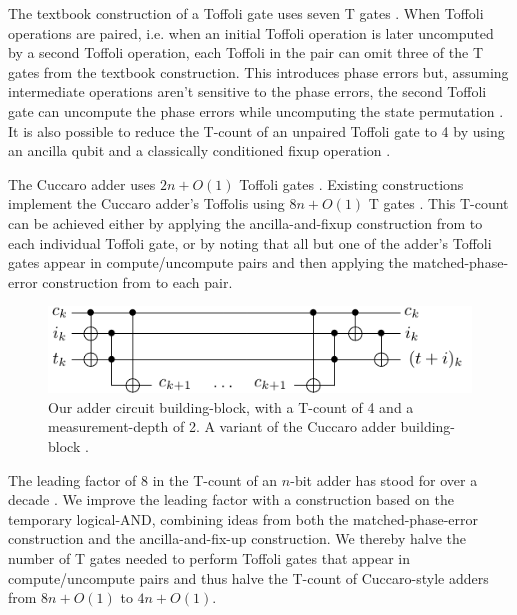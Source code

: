 \documentclass[twocolumn,accepted=2018-05-25]{quantumarticle}
\begin{document}
The textbook construction of a Toffoli gate uses seven T gates \cite{Nielsen2009}.
When Toffoli operations are paired, i.e. when an initial Toffoli operation is later uncomputed by a second Toffoli operation, each Toffoli in the pair can omit three of the T gates from the textbook construction.
This introduces phase errors but, assuming intermediate operations aren't sensitive to the phase errors, the second Toffoli gate can uncompute the phase errors while uncomputing the state permutation \cite{Barenco1995, Nielsen2009}.
It is also possible to reduce the T-count of an unpaired Toffoli gate to 4 by using an ancilla qubit and a classically conditioned fixup operation \cite{Jones2013}.

The Cuccaro adder uses $2n + O(1)$ Toffoli gates \cite{Cuccaro2004}.
Existing constructions implement the Cuccaro adder's Toffolis using $8n + O(1)$ T gates \cite{Barenco1995, Cuccaro2004, Amy2013}.
This T-count can be achieved either by applying the ancilla-and-fixup construction from \cite{Jones2013} to each individual Toffoli gate, or by noting that all but one of the adder's Toffoli gates appear in compute/uncompute pairs and then applying the matched-phase-error construction from \cite{Barenco1995, Nielsen2009} to each pair.

\begin{figure}
  \includegraphics[width=\linewidth]{adder-building-block.pdf}
  \caption{
	Our adder circuit building-block, with a T-count of 4 and a measurement-depth of 2.
	A variant of the Cuccaro adder building-block \cite{Cuccaro2004}.
  }
  \label{fig:adder-building-block}
\end{figure}

The leading factor of 8 in the T-count of an $n$-bit adder has stood for over a decade \cite{Barenco1995, Cuccaro2004, AustinDiscussionsAndEmails2017}.
We improve the leading factor with a construction based on the temporary logical-AND, combining ideas from both the matched-phase-error construction and the ancilla-and-fix-up construction.
We thereby halve the number of T gates needed to perform Toffoli gates that appear in compute/uncompute pairs and thus halve the T-count of Cuccaro-style adders from $8n + O(1)$ to $4n + O(1)$.
\end{document}
